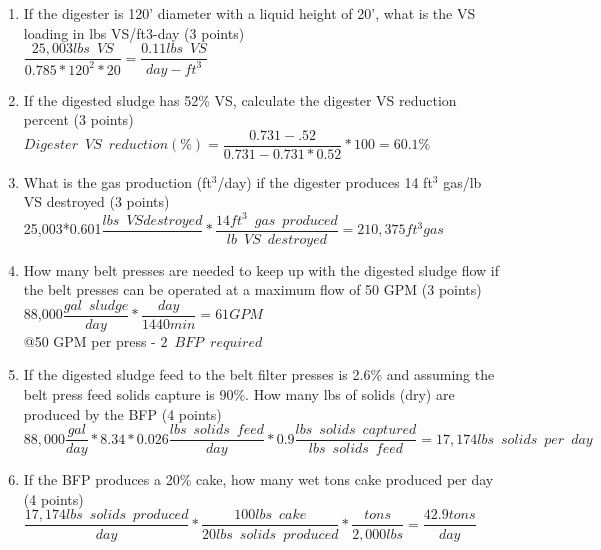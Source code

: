 \begin{enumerate}
\begin{enumerate}
\item If the digester is 120’ diameter with a liquid height of 20’, what is the VS loading in lbs VS/ft3-day (3 points)\\

$\dfrac{25,003 lbs \enspace VS}{0.785*120^2*20}=\boxed{\dfrac{0.11 lbs \enspace VS}{day-ft^3}}$\\
\vspace{0.25cm}

\item If the digested sludge has 52\% VS, calculate the digester VS reduction percent (3 points)\\

$
Digester \enspace VS \enspace reduction (\%)=
	\dfrac
	{0.731 - .52}
	{0.731 - 0.731 *0.52}
	*100=\boxed{60.1\%}
$\\
\vspace{0.25cm}

\item What is the gas production (ft$^3$/day) if the digester produces 14 ft$^3$ gas/lb VS destroyed (3 points)\\
25,003*0.601$\dfrac{lbs\enspace VS destroyed}{}*\dfrac{14ft^3 \enspace gas \enspace produced}{lb \enspace VS \enspace destroyed}=\boxed{210,375ft^3 gas}$
\\
\vspace{0.25cm}

\item How many belt presses are needed to keep up with the digested sludge flow if the belt presses can be operated at a maximum flow of 50 GPM (3 points)\\

88,000$\dfrac{gal \enspace sludge}{day}*\dfrac{day}{1440min}=61 GPM$\\
@50 GPM per press - $\boxed{2 \enspace BFP \enspace required}$
\vspace{0.25cm}
\item If the digested sludge feed to the belt filter presses is 2.6\% and assuming the belt press feed solids capture is 90\%.  How many lbs of solids (dry) are produced by the BFP (4 points)\\
$88,000\dfrac{gal}{day}*8.34*0.026\dfrac{lbs \enspace solids \enspace feed}{day}*0.9\dfrac{lbs \enspace solids \enspace captured}{lbs \enspace solids \enspace feed}=\boxed{17,174 lbs \enspace solids \enspace per \enspace day}$
\vspace{0.25cm}

\item If the BFP produces a 20\% cake, how many wet tons cake produced per day (4 points)\\
$\dfrac{17,174 lbs \enspace solids \enspace produced}{day}*\dfrac{100 lbs \enspace cake}{20 lbs \enspace solids \enspace produced}*\dfrac{tons}{2,000 lbs}=\boxed{\dfrac{42.9tons}{day}}$
\vspace{0.25cm}


\end{enumerate}
\end{enumerate}
